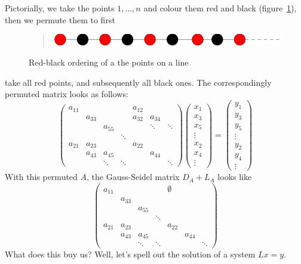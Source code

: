 Pictorially, we take the points $1,\ldots,n$ and colour them red and
black (figure~\ref{fig:red-black-1d}), then we permute them to first
\begin{figure}
  \begin{quote}
    \includegraphics[scale=.12]{graphics/red-black-1d}
  \end{quote}
  \caption{Red-black ordering of a the points on a line}
  \label{fig:red-black-1d}
\end{figure}
take all red points, and subsequently all black ones.
The correspondingly permuted matrix looks as follows:
\[ 
\begin{pmatrix}
  a_{11}&&&&a_{12}\\ &a_{33}&&&a_{32}&a_{34}\\ &&a_{55}&&&\ddots&\ddots\\
  &&&\ddots\\
  a_{21}&a_{23}&&&a_{22}\\ &a_{43}&a_{45}&&&a_{44}\\ &&\ddots&\ddots&&&\ddots
\end{pmatrix}
\begin{pmatrix}  x_1\\ x_3\\ x_5\\ \vdots\\ x_2\\ x_4\\ \vdots\end{pmatrix} =
\begin{pmatrix}  y_1\\ y_3\\ y_5\\ \vdots\\ y_2\\ y_4\\ \vdots\end{pmatrix}
\]
With this permuted $A$, the Gauss-Seidel matrix $D_A+L_A$ looks like
\[ 
\begin{pmatrix}
  a_{11}&&&&\emptyset\\ &a_{33}\\ &&a_{55}\\
  &&&\ddots\\
  a_{21}&a_{23}&&&a_{22}\\ &a_{43}&a_{45}&&&a_{44}\\ &&\ddots&\ddots&&&\ddots
\end{pmatrix}
\]
What does this buy us? Well, let's spell out the solution of a system
$Lx=y$.

